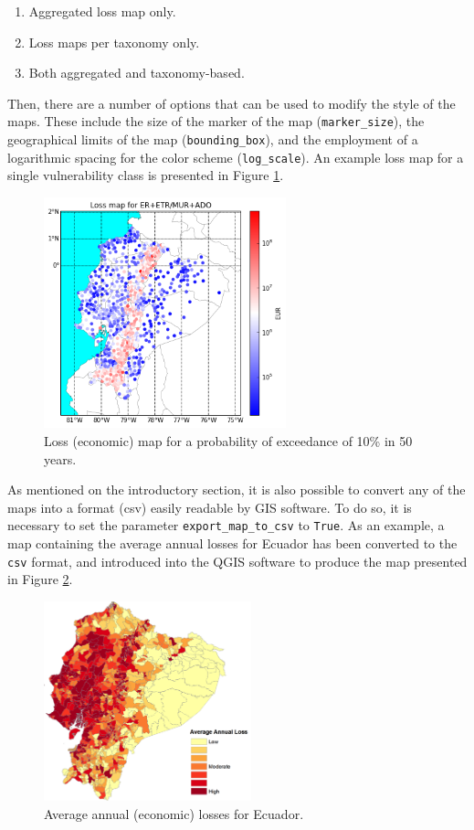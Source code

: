 \begin{enumerate}
\item Aggregated loss map only.
\item Loss maps per taxonomy only.
\item Both aggregated and taxonomy-based.\\
\end{enumerate}

Then, there are a number of options that can be used to modify the style of the maps. These include the size of the marker of the map (\verb=marker_size=), the geographical limits of the map (\verb=bounding_box=), and the employment of a logarithmic spacing for the color scheme (\verb=log_scale=). An example loss map for a single vulnerability class is presented in Figure \ref{fig:loss_map}.

\begin{figure}[htb]
  \centering
      \includegraphics[width=7cm]{figures/loss_map.png}
  \caption{Loss (economic) map for a probability of exceedance of 10\% in 50 years.}
  \label{fig:loss_map}
\end{figure}

As mentioned on the introductory section, it is also possible to convert any of the maps into a format (csv) easily readable by GIS software. To do so, it is necessary to set the parameter \verb=export_map_to_csv= to \verb=True=. As an example, a map containing the average annual losses for Ecuador has been converted to the \verb=csv= format, and introduced into the QGIS software to produce the map presented in Figure \ref{fig:all_loss_map}.

\begin{figure}[htb]
  \centering
      \includegraphics[width=6cm]{figures/loss_map_AAL.png}
  \caption{Average annual (economic) losses for Ecuador.}
  \label{fig:all_loss_map}
\end{figure}

